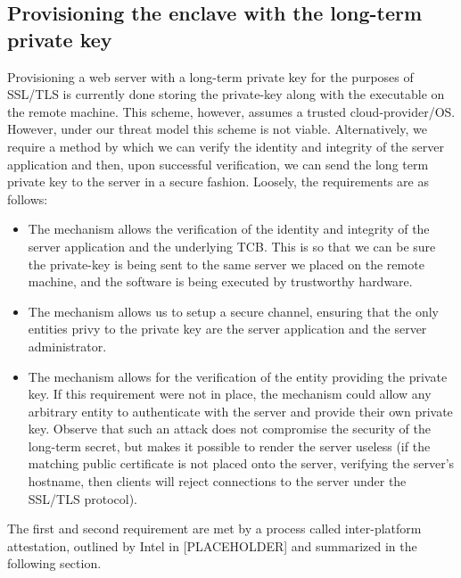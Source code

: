 \documentclass[../main.tex]{subfiles}
\begin{document}
\subsection{Provisioning the enclave with the long-term private key}
Provisioning a web server with a long-term private key for the purposes of SSL/TLS is currently done storing the private-key along with the executable on 
the remote machine. This scheme, however, assumes a trusted cloud-provider/OS. However, under our threat model this scheme is not viable. Alternatively,
we require a method by which we can verify the identity and integrity of the server application and then, upon successful verification, we can 
send the long term private key to the server in a secure fashion. Loosely, the requirements are as follows:
\begin{itemize}
	\item The mechanism allows the verification of the identity and integrity of the server application and the underlying TCB.
	      This is so that we can be sure the private-key is being sent to the same server we placed on the remote machine, and the software is being executed by
	      trustworthy hardware.
	\item The mechanism allows us to setup a secure channel, ensuring that the only entities privy to the private key 
	      are the server application and the server administrator.
	\item The mechanism allows for the verification of the entity providing the private key. If this requirement were not in place, the mechanism could 	  allow any arbitrary entity to authenticate with the server and provide their own private key. Observe that such an attack does not compromise
	the security of the long-term secret, but makes it possible to render the server useless (if the matching public certificate is not placed onto the server, verifying the server's hostname, then clients will reject connections to the server under the SSL/TLS protocol). %
\end{itemize} 
The first and second requirement are met by a process called inter-platform attestation, outlined by Intel in [PLACEHOLDER] and summarized in the following section.
\end{document}
